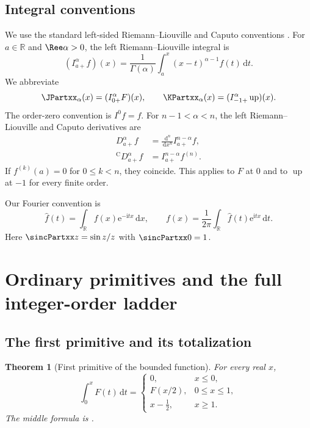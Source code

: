 \documentclass[11pt,oneside]{article}
\newtheorem{theorem}{Theorem}[section]
\theoremstyle{definition}
\theoremstyle{remark}
\newcommand{\Up}{\operatorname{up}}
\newcommand{\R}{\mathbb R}
\newcommand{\dd}{\,\mathrm d}
\newcommand{\e}{\mathrm e}
\newcommand{\ii}{\mathrm i}
\newcommand{\1}{\mathbf 1}
\begin{document}
\subsection{Integral conventions}

We use the standard left-sided Riemann--Liouville and Caputo conventions
\cite{p7:samko,p7:caputo1967,p7:cong2021}.  For $a\in\R$ and $\Ree\alpha>0$, the left
Riemann--Liouville integral is
\begin{equation}
 (I_{a+}^{\alpha}f)(x)=\frac1{\Gamma(\alpha)}
 \int_a^x(x-t)^{\alpha-1}f(t)\dd t.
 \label{p7:eq:RL-int}
\end{equation}
We abbreviate
\begin{equation}
 \JPartxx_\alpha(x)=(I_{0+}^{\alpha}F)(x),
 \qquad
 \KPartxx_\alpha(x)=(I_{-1+}^{\alpha}\Up)(x).
 \label{p7:eq:J-K}
\end{equation}
The order-zero convention is $I^0f=f$.  For $n-1<\alpha<n$, the left
Riemann--Liouville and Caputo derivatives are
\begin{align}
 D_{a+}^{\alpha}f&=\frac{\dd^n}{\dd x^n}I_{a+}^{n-\alpha}f,
 \label{p7:eq:RL-deriv}\\
 {}^{\mathrm C}D_{a+}^{\alpha}f&=I_{a+}^{n-\alpha}f^{(n)}.
 \label{p7:eq:Caputo}
\end{align}
If $f^{(k)}(a)=0$ for $0\le k<n$, they coincide.  This applies to $F$ at $0$ and to
$\Up$ at $-1$ for every finite order.

Our Fourier convention is
\begin{equation}
 \widehat f(t)=\int_{\R}f(x)\e^{-\ii tx}\dd x,
 \qquad
 f(x)=\frac1{2\pi}\int_{\R}\widehat f(t)\e^{\ii tx}\dd t.
 \label{p7:eq:fourier-conv}
\end{equation}
Here $\sincPartxx z=\sin z/z$ with $\sincPartxx0=1$.

\section{Ordinary primitives and the full integer-order ladder}
\label{p7:sec:ordinary}

\subsection{The first primitive and its totalization}

\begin{theorem}[First primitive of the bounded function]
\label{p7:thm:first-primitive}
For every real $x$,
\begin{equation}
 \int_0^xF(t)\dd t=
 \begin{cases}
  0,&x\le0,\\[0.2em]
  F(x/2),&0\le x\le1,\\[0.2em]
  x-\tfrac12,&x\ge1.
 \end{cases}
 \label{p7:eq:first-primitive-total}
\end{equation}
The middle formula is \statusproved.
\end{theorem}
\end{document}
